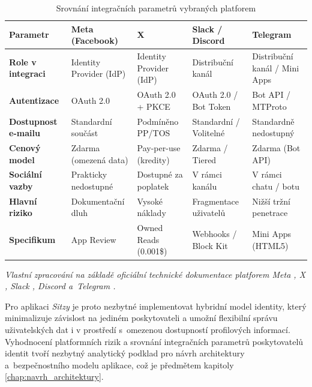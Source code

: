 \documentclass[male,czech,api_bc]{kitheses}
\renewcommand{\arraystretch}{1.23}
\newcommand{\zdroj}[1]{%
    \vspace{1ex}%
    {\footnotesize \raggedright \textit{#1}\par}%
}
\begin{document}
\begin{table}[htbp]
\centering
\small
\renewcommand{\arraystretch}{1.4}
\caption{Srovnání integračních parametrů vybraných platforem}
\label{tab:srovnani_api}
\begin{tabularx}{\textwidth}{@{} l >{\raggedright\arraybackslash}X >{\raggedright\arraybackslash}X >{\raggedright\arraybackslash}X >{\raggedright\arraybackslash}X @{}}
\toprule
\textbf{Parametr} & \textbf{Meta (Facebook)} & \textbf{X} & \textbf{Slack / Discord} & \textbf{Telegram} \\ 
\midrule
\textbf{Role v integraci} & Identity Provider (IdP) & Identity Provider (IdP) & Distribuční kanál & Distribuční kanál / Mini Apps \\ 
\textbf{Autentizace} & OAuth 2.0 & OAuth 2.0 + PKCE & OAuth 2.0 / Bot Token & Bot API / MTProto \\ 
\textbf{Dostupnost e-mailu} & Standardní součást & Podmíněno PP/TOS & Standardní / Volitelné & Standardně nedostupný \\ 
\textbf{Cenový model} & Zdarma (omezená data) & Pay-per-use (kredity) & Zdarma / Tiered & Zdarma (Bot API) \\ 
\textbf{Sociální vazby} & Prakticky nedostupné & Dostupné za poplatek & V rámci kanálu & V rámci chatu / botu \\ 
\textbf{Hlavní riziko} & Dokumentační dluh & Vysoké náklady & Fragmentace uživatelů & Nižší tržní penetrace \\ 
\textbf{Specifikum} & App Review & Owned Reads (0.001\$) & Webhooks / Block Kit & Mini Apps (HTML5) \\ 
\bottomrule
\end{tabularx}

\zdroj{Vlastní zpracování na základě oficiální technické dokumentace platforem Meta \cite{MetaDeveloper20251030}, X \cite{XAPI20251110}, Slack \cite{SlackDocs2026}, Discord \cite{DiscordDocs2026} a~Telegram \cite{TelegramDocs2026}.}
\end{table}

Pro aplikaci \textit{Sitzy} je proto nezbytné implementovat hybridní model identity, který minimalizuje závislost na jediném poskytovateli a umožní flexibilní správu uživatelských dat i v prostředí s~omezenou dostupností profilových informací. Vyhodnocení platformních rizik a srovnání integračních parametrů poskytovatelů identit tvoří nezbytný analytický podklad pro návrh architektury a~bezpečnostního modelu aplikace, což je předmětem kapitoly \vref{chap:navrh_architektury}.
\end{document}
